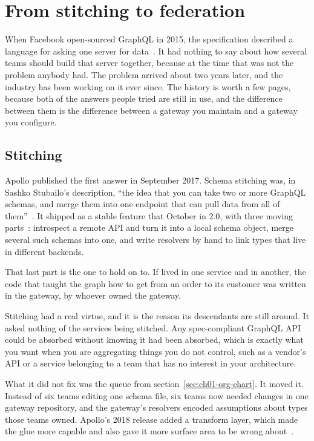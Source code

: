 \section{From stitching to federation}
\label{sec:ch01-stitching-to-federation}

When Facebook open-sourced GraphQL in 2015, the specification described a
language for asking one server for data~\autocite{byron2015graphql}. It had
nothing to say about how several teams should build that server together,
because at the time that was not the problem anybody had. The problem arrived
about two years later, and the industry has been working on it ever since. The
history is worth a few pages, because both of the answers people tried are
still in use, and the difference between them is the difference between a
gateway you maintain and a gateway you configure.

\subsection*{Stitching}
%

Apollo published the first answer in September 2017. Schema stitching was, in
Sashko Stubailo's description, \enquote{the idea that you can take two or more
GraphQL schemas, and merge them into one endpoint that can pull data from all
of them}~\autocite{stubailo2017stitching}. It shipped as a stable feature that
October in  2.0, with three moving
parts~\autocite{novikov2017tools2}: introspect a remote API and turn it into a
local schema object, merge several such schemas into one, and write resolvers
by hand to link types that live in different backends.

That last part is the one to hold on to. If  lived in one service
and  in another, the code that taught the graph how to get from an
order to its customer was written in the gateway, by whoever owned the gateway.

Stitching had a real virtue, and it is the reason its descendants are still
around. It asked nothing of the services being stitched. Any spec-compliant
GraphQL API could be absorbed without knowing it had been absorbed, which is
exactly what you want when you are aggregating things you do not control, such
as a vendor's API or a service belonging to a team that has no interest in your
architecture.

What it did not fix was the queue from section~\ref{sec:ch01-org-chart}. It
moved it. Instead of six teams editing one schema file, six teams now needed
changes in one gateway repository, and the gateway's resolvers encoded
assumptions about types those teams owned. Apollo's 2018 release added a
transform layer, which made the glue more capable and also gave it more surface
area to be wrong about~\autocite{stubailo2018nextgen}.


